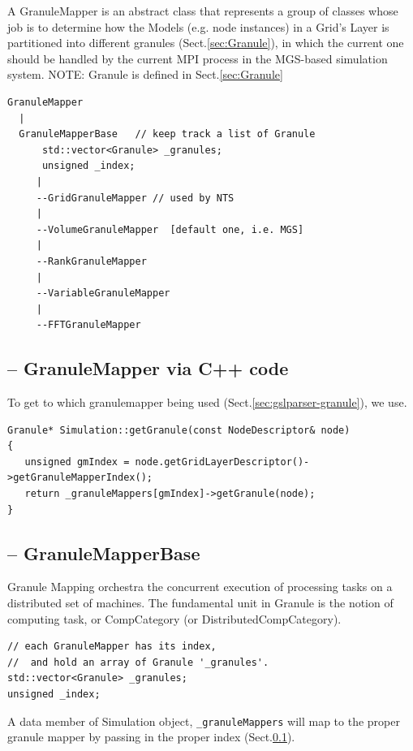 A GranuleMapper is an abstract class that represents a group of classes whose
job is to determine how the Models (e.g. node instances) in a Grid's Layer is
partitioned into different granules (Sect.\ref{sec:Granule}), in which the
current one should be handled by the current MPI process in the MGS-based
simulation system. NOTE: Granule is defined in Sect.\ref{sec:Granule}
\begin{verbatim}
GranuleMapper          
  |
  GranuleMapperBase   // keep track a list of Granule
      std::vector<Granule> _granules;
      unsigned _index;
     |
     --GridGranuleMapper // used by NTS
     |
     --VolumeGranuleMapper  [default one, i.e. MGS]
     |
     --RankGranuleMapper
     |
     --VariableGranuleMapper
     |
     --FFTGranuleMapper
\end{verbatim}

\subsection{-- GranuleMapper via C++ code}
\label{sec:GranuleMapper-access-via-C++}

To get to which granulemapper being used (Sect.\ref{sec:gslparser-granule}), we
use.

\begin{verbatim}
Granule* Simulation::getGranule(const NodeDescriptor& node)
{
   unsigned gmIndex = node.getGridLayerDescriptor()->getGranuleMapperIndex();
   return _granuleMappers[gmIndex]->getGranule(node);
}
\end{verbatim}

\subsection{-- GranuleMapperBase}
\label{sec:GranuleMapperBase}

Granule Mapping orchestra the concurrent execution of processing tasks on a
distributed set of machines. The fundamental unit in Granule is the notion of
computing task, or CompCategory (or DistributedCompCategory).
 
\begin{verbatim}
// each GranuleMapper has its index,
//  and hold an array of Granule '_granules'.
std::vector<Granule> _granules;
unsigned _index;
\end{verbatim}
A data member of Simulation object, \verb!_granuleMappers! will map to the
proper granule mapper by passing in the proper index
(Sect.\ref{sec:GranuleMapper-access-via-C++}).

